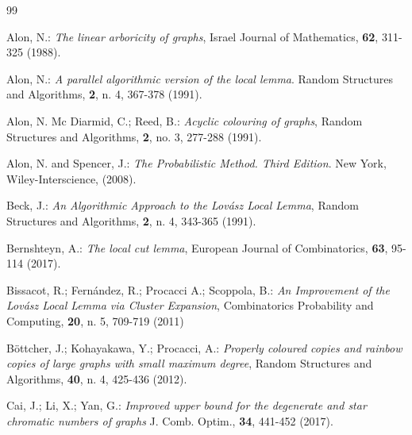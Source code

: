 \documentclass[11pt]{article}
\begin{document}
\begin{thebibliography}{99}





 Alon, N.: {\it The linear arboricity of graphs}, Israel Journal of Mathematics, {\bf 62}, 311-325 (1988).

 Alon, N.: {\it A parallel algorithmic version of the local lemma}. Random Structures and Algorithms,
{\bf 2}, n. 4, 367-378  (1991).

 Alon, N. Mc Diarmid, C.; Reed, B.: {\it  Acyclic colouring of graphs}, Random Structures and Algorithms, {\bf 2}, no. 3, 277-288 (1991).

 Alon, N. and Spencer, J.: {\it The Probabilistic Method. Third  Edition}. New York, Wiley-Interscience, (2008).


 Beck, J.: {\it An Algorithmic Approach to the Lov\'asz Local Lemma}, Random Structures and Algorithms,
{\bf 2}, n. 4, 343-365 (1991).


 Bernshteyn, A.:  {\it The local cut lemma},  European Journal of Combinatorics, {\bf 63}, 95-114 (2017).


 Bissacot, R.; Fern\'andez, R.; Procacci A.; Scoppola, B.: {\it An Improvement of the Lov\'asz Local Lemma via Cluster Expansion},
Combinatorics Probability and Computing, {\bf 20}, n. 5, 709-719
(2011)

  B\"{o}ttcher, J.; Kohayakawa, Y.; Procacci, A.: {\it Properly coloured copies and rainbow
copies of large graphs with small maximum degree},
Random Structures and Algorithms, {\bf 40}, n. 4,  425-436 (2012).

 Cai, J.; Li, X.; Yan, G.: {\it Improved upper bound for the degenerate and star
chromatic numbers of graphs} J. Comb. Optim.,  {\bf 34}, 441-452 (2017).


\end{thebibliography}
\end{document}
